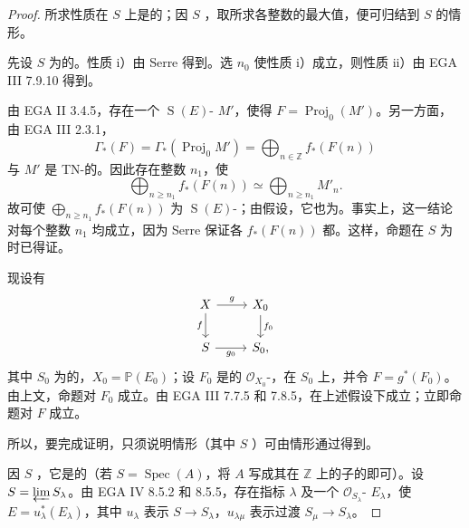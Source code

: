 \begin{proof}
所求性质在 $S$ 上是的；因 $S$ ，取所求各整数的最大值，便可归结到 $S$ 的情形。

先设 $S$ 为的。性质 i）由 Serre 得到。选 $n_0$ 使性质 i）成立，则性质 ii）由 EGA III 7.9.10 得到。

由 EGA II 3.4.5，存在一个 $\operatorname{S}(E)$- $M'$，使得 $F=\operatorname{Proj}_0(M')$。另一方面，由 EGA III 2.3.1，
\[
\Gamma_*(F)=\Gamma_*(\operatorname{Proj}_0M')
=\bigoplus_{n\in\mathbb Z}f_*(F(n))
\]
与 $M'$ 是 TN-的。因此存在整数 $n_1$，使
\[
\bigoplus_{n\geq n_1}f_*(F(n))\simeq\bigoplus_{n\geq n_1}M'_n.
\]
故可使 $\bigoplus_{n\geq n_1}f_*(F(n))$ 为 $\operatorname{S}(E)$-；由假设，它也为。事实上，这一结论对每个整数 $n_1$ 均成立，因为 Serre 保证各 $f_*(F(n))$ 都。这样，命题在 $S$ 为时已得证。

现设有
\[
\begin{tikzcd}
X\arrow[r,"g"]\arrow[d,"f"']&X_0\arrow[d,"f_0"]\\
S\arrow[r,"g_0"']&S_0,
\end{tikzcd}
\]
其中 $S_0$ 为的，$X_0=\mathbb P(E_0)$；设 $F_0$ 是的 $\mathcal O_{X_0}$-，在 $S_0$ 上，并令 $F=g^*(F_0)$。由上文，命题对 $F_0$ 成立。由 EGA III 7.7.5 和 7.8.5，在上述假设下成立；立即命题对 $F$ 成立。

所以，要完成证明，只须说明情形（其中 $S$ ）可由情形通过得到。

因 $S$ ，它是的（若 $S=\operatorname{Spec}(A)$，将 $A$ 写成其在 $\mathbb Z$ 上的子的即可）。设 $S=\varprojlim S_\lambda$。由 EGA IV 8.5.2 和 8.5.5，存在指标 $\lambda$ 及一个 $\mathcal O_{S_\lambda}$- $E_\lambda$，使 $E=u_\lambda^*(E_\lambda)$，其中 $u_\lambda$ 表示 $S\to S_\lambda$，$u_{\lambda\mu}$ 表示过渡 $S_\mu\to S_\lambda$。


\end{proof}
